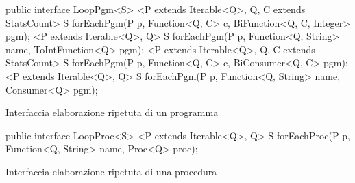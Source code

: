 \begin{elisting}[!htb]
    \begin{javacode}
        public interface LoopPgm<S> {
    <P extends Iterable<Q>, Q, C extends StatsCount> S forEachPgm(P p, Function<Q, C> c,
                                                                  BiFunction<Q, C, Integer> pgm);
    <P extends Iterable<Q>, Q> S forEachPgm(P p, Function<Q, String> name, ToIntFunction<Q> pgm);
    <P extends Iterable<Q>, Q, C extends StatsCount> S forEachPgm(P p, Function<Q, C> c, BiConsumer<Q, C> pgm);
    <P extends Iterable<Q>, Q> S forEachPgm(P p, Function<Q, String> name, Consumer<Q> pgm);
}
    \end{javacode}
    \caption{Interfaccia elaborazione ripetuta di un programma}
    \label{lst:loopPgm}
\end{elisting}

\begin{elisting}[!htb]
    \begin{javacode}
        public interface LoopProc<S> {
    <P extends Iterable<Q>, Q> S forEachProc(P p, Function<Q, String> name, Proc<Q> proc);
}
    \end{javacode}
    \caption{Interfaccia elaborazione ripetuta di una procedura}
    \label{lst:loopProc}
\end{elisting}
